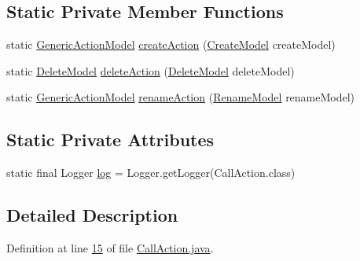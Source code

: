 \subsection*{Static Private Member Functions}
\begin{DoxyCompactItemize}
\item 
static \hyperlink{interfacecom_1_1poly_1_1nlp_1_1filekommander_1_1views_1_1models_1_1_generic_action_model}{Generic\-Action\-Model} \hyperlink{classcom_1_1poly_1_1nlp_1_1filekommander_1_1file_1_1actions_1_1_call_action_a9732d3e6e92378607607b7bd0bb91736}{create\-Action} (\hyperlink{classcom_1_1poly_1_1nlp_1_1filekommander_1_1views_1_1models_1_1_create_model}{Create\-Model} create\-Model)
\item 
static \hyperlink{classcom_1_1poly_1_1nlp_1_1filekommander_1_1views_1_1models_1_1_delete_model}{Delete\-Model} \hyperlink{classcom_1_1poly_1_1nlp_1_1filekommander_1_1file_1_1actions_1_1_call_action_ae2b04b022b8ec6d18419cc14d747972c}{delete\-Action} (\hyperlink{classcom_1_1poly_1_1nlp_1_1filekommander_1_1views_1_1models_1_1_delete_model}{Delete\-Model} delete\-Model)
\item 
static \hyperlink{interfacecom_1_1poly_1_1nlp_1_1filekommander_1_1views_1_1models_1_1_generic_action_model}{Generic\-Action\-Model} \hyperlink{classcom_1_1poly_1_1nlp_1_1filekommander_1_1file_1_1actions_1_1_call_action_a11aae4f7ed1d404e8cd63c48ce91f427}{rename\-Action} (\hyperlink{classcom_1_1poly_1_1nlp_1_1filekommander_1_1views_1_1models_1_1_rename_model}{Rename\-Model} rename\-Model)
\end{DoxyCompactItemize}
\subsection*{Static Private Attributes}
\begin{DoxyCompactItemize}
\item 
static final Logger \hyperlink{classcom_1_1poly_1_1nlp_1_1filekommander_1_1file_1_1actions_1_1_call_action_a65b722d9482bd93c3ae2b31f51050a08}{log} = Logger.\-get\-Logger(Call\-Action.\-class)
\end{DoxyCompactItemize}


\subsection{Detailed Description}


Definition at line \hyperlink{L15}{15} of file \hyperlink{}{Call\-Action.\-java}.



